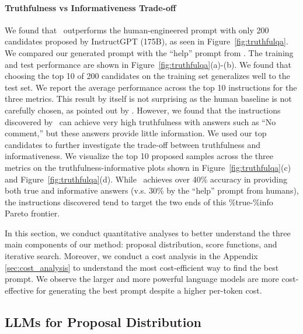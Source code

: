 {\paragraph{Truthfulness vs Informativeness Trade-off}
We found that \algname~outperforms the human-engineered prompt with only 200 candidates proposed by InstructGPT (175B), as seen in Figure~\ref{fig:truthfulqa}. We compared our generated prompt with the ``help'' prompt from \citet{lin2022truthfulqa}.
The training and test performance are shown in Figure~\ref{fig:truthfulqa}(a)-(b). We found that choosing the top 10 of 200 candidates on the training set generalizes well to the test set. We report the average performance across the top 10 instructions for the three metrics.
This result by itself is not surprising as the human baseline is not carefully chosen, as pointed out by \citet{askell2021general}. However, we found that the instructions discovered by \algname~can achieve very high truthfulness with answers such as ``No comment,'' but these answers provide little information. We used our top candidates to further investigate the trade-off between truthfulness and informativeness. We visualize the top 10 proposed samples across the three metrics on the truthfulness-informative plots shown in Figure~\ref{fig:truthfulqa}(c) and Figure~\ref{fig:truthfulqa}(d). While \algname~achieves over 40\% accuracy in providing both true and informative answers (v.s. 30\% by the ``help'' prompt from humans), the instructions discovered tend to target the two ends of this \%true-\%info Pareto frontier. 
}

In this section, we conduct quantitative analyses to better understand the three main components of our method: proposal distribution, score functions, and iterative search. Moreover, we conduct a cost analysis in the Appendix \ref{sec:cost_analysis} to understand the most cost-efficient way to find the best prompt. We observe the larger and more powerful language models are more cost-effective for generating the best prompt despite a higher per-token cost.

\subsection{LLMs for Proposal Distribution}

